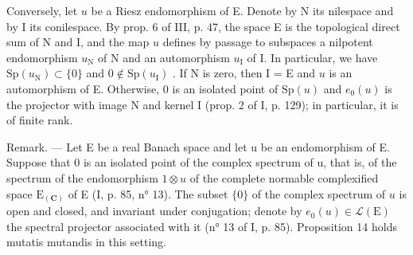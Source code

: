 Conversely, let \(u\) be a Riesz endomorphism of E. Denote by N its nilespace and by I its conilespace. By prop. 6 of III, p. 47, the space E is the topological direct sum of N and I, and the map \(u\) defines by passage to subspaces a nilpotent endomorphism \(u_{\mathrm{N}}\) of N and an automorphism \(u_{\mathrm{I}}\) of I. In particular, we have \(\mathrm{Sp}(u_{\mathrm{N}}) \subset \{0\}\) and \(0 \not\in \mathrm{Sp}(u_{\mathrm{I}})\) . If N is zero, then I = E and \(u\) is an automorphism of E. Otherwise, 0 is an isolated point of \(\mathrm{Sp}(u)\) and \(e_0(u)\) is the projector with image N and kernel I (prop. 2 of I, p. 129); in particular, it is of finite rank.

Remark. --- Let E be a real Banach space and let u be an endomorphism of E. Suppose that 0 is an isolated point of the complex spectrum of u, that is, of the spectrum of the endomorphism \(1 \otimes u\) of the complete normable complexified space \(\mathrm{E}_{(\mathbf{C})}\) of E (I, p. 85, n° 13). The subset \(\{0\}\) of the complex spectrum of \(u\) is open and closed, and invariant under conjugation; denote by \(e_0(u) \in \mathcal{L}(\mathrm{E})\) the spectral projector associated with it (n° 13 of I, p. 85). Proposition 14 holds mutatis mutandis in this setting.

